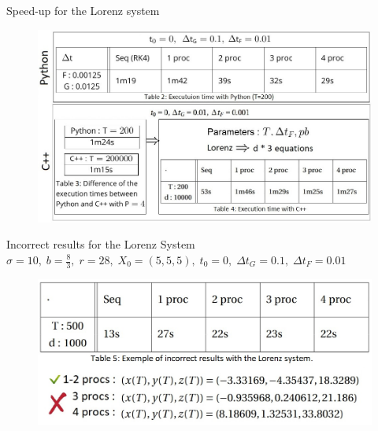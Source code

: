\begin{frame}{Speed-up for the Lorenz system}
	\begin{figure}
		\centering
		\includegraphics[width=0.9\linewidth]{"images/parareal/speedup_lorenz.jpg"}
	\end{figure}
\end{frame}

\begin{frame}{Incorrect results for the Lorenz System}
	\centering
	$\sigma=10, \; b=\frac{8}{3}, \; r=28, \; X_0=(5,5,5), \; t_0=0, \; \Delta t_G=0.1, \; \Delta t_F=0.01$
	\begin{figure}
		\centering
		\includegraphics[width=0.9\linewidth]{"images/parareal/incorrect_results.jpg"}
	\end{figure}
\end{frame}


